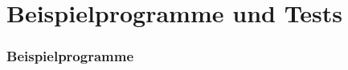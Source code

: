 \section{Beispielprogramme und Tests}

\begin{frame}
\frametitle{Beispielprogramme}

\begin{figure}
\end{figure}
\end{frame}